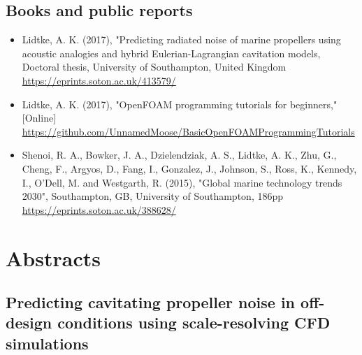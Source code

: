 \documentclass[a4paper,10pt]{article}
\begin{document}
\subsection{Books and public reports}
%
\begin{itemize}
\item Lidtke, A. K. (2017), "Predicting radiated noise of marine propellers using acoustic analogies and hybrid Eulerian-Lagrangian cavitation models,
	Doctoral thesis, University of Southampton, United Kingdom
	\cite{Lidtke2017d}
	\\ \url{https://eprints.soton.ac.uk/413579/}
%
\item Lidtke, A. K. (2017), "OpenFOAM programming tutorials for beginners," [Online]
	\cite{Lidtke2017c}
	\\ \url{https://github.com/UnnamedMoose/BasicOpenFOAMProgrammingTutorials}
%
\item Shenoi, R. A., Bowker, J. A., Dzielendziak, A. S., Lidtke, A. K., Zhu, G., Cheng, F.,
	Argyos, D., Fang, I., Gonzalez, J., Johnson, S., Ross, K., Kennedy, I., O'Dell, M.
	and Westgarth, R. (2015), "Global marine technology trends 2030", Southampton, GB,
	University of Southampton, 186pp
	\cite{Shenoi2015}
	\\ \url{https://eprints.soton.ac.uk/388628/}
%
\end{itemize}

\newpage

\section{Abstracts}

\subsection{Predicting cavitating propeller noise in off-design conditions using scale-resolving CFD simulations \cite{lidtke_predicting_2022}}
\end{document}
